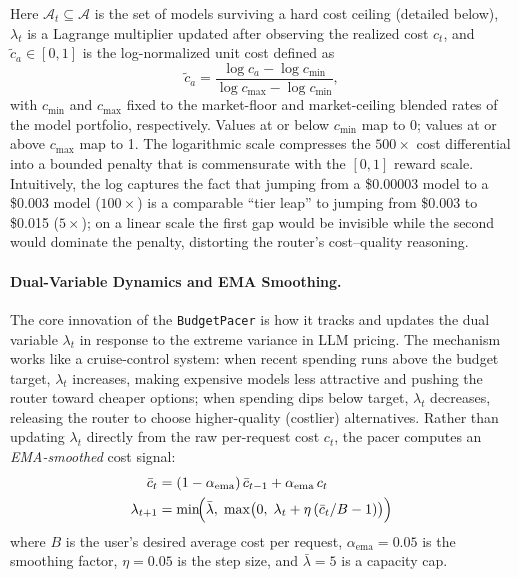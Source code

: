 Here $\mathcal{A}_t \subseteq \mathcal{A}$ is the set of models surviving a hard cost ceiling (detailed below), $\lambda_t$ is a Lagrange multiplier updated after observing the realized cost $c_t$, and $\tilde{c}_a \in [0,1]$ is the log-normalized unit cost defined as
\begin{equation}
    \tilde{c}_a = \frac{\log c_a - \log c_{\min}}{\log c_{\max} - \log c_{\min}},
    \label{eq:cost_norm}
\end{equation}
with $c_{\min}$ and $c_{\max}$ fixed to the market-floor and market-ceiling blended rates of the model portfolio, respectively. Values at or below $c_{\min}$ map to 0; values at or above $c_{\max}$ map to 1. The logarithmic scale compresses the $500\times$ cost differential into a bounded penalty that is commensurate with the $[0,1]$ reward scale.  Intuitively, the log captures the fact that jumping from a \$0.00003 model to a \$0.003 model ($100\times$) is a comparable ``tier leap'' to jumping from \$0.003 to \$0.015 ($5\times$); on a linear scale the first gap would be invisible while the second would dominate the penalty, distorting the router's cost--quality reasoning.

\paragraph{Dual-Variable Dynamics and EMA Smoothing.}
The core innovation of the \texttt{BudgetPacer} is how it tracks and updates the dual variable $\lambda_t$ in response to the extreme variance in LLM pricing.  The mechanism works like a cruise-control system: when recent spending runs above the budget target, $\lambda_t$ increases, making expensive models less attractive and pushing the router toward cheaper options; when spending dips below target, $\lambda_t$ decreases, releasing the router to choose higher-quality (costlier) alternatives.  Rather than updating $\lambda_t$ directly from the raw per-request cost $c_t$, the pacer computes an \emph{EMA-smoothed} cost signal:
\begin{align}
    \bar{c}_t &= (1 - \alpha_{\mathrm{ema}})\,\bar{c}_{t-1}
                 + \alpha_{\mathrm{ema}}\,c_t
    \label{eq:cost_ema} \\
    \lambda_{t+1} &= \min\!\Bigl(\bar\lambda,\;
    \max\bigl(0,\;\lambda_t + \eta\,(\bar{c}_t / B - 1)\bigr)\Bigr)
    \label{eq:dual_update}
\end{align}
where $B$ is the user's desired average cost per request, $\alpha_{\mathrm{ema}}=0.05$ is the smoothing factor, $\eta=0.05$ is the step size, and $\bar\lambda=5$ is a capacity cap.

